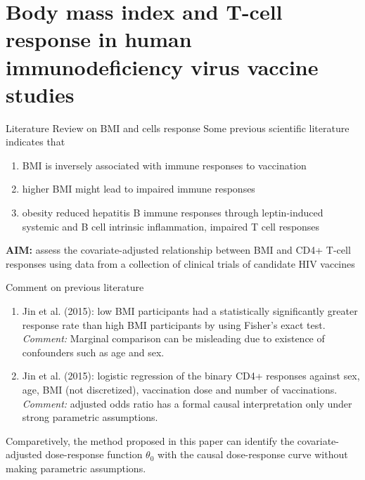 \documentclass{beamer}
\begin{document}
\section{Body mass index and T-cell response in human immunodeficiency virus vaccine studies}

\begin{frame}{Literature Review on BMI and cells response}
Some previous scientific literature indicates that
\begin{enumerate}
	\item BMI is inversely associated with immune responses to vaccination

	\item higher BMI might lead to impaired	immune responses

	\item obesity reduced hepatitis B immune responses through leptin-induced systemic and B cell intrinsic inflammation, impaired T cell responses
\end{enumerate}
\textbf{AIM:} assess the covariate-adjusted relationship between BMI and CD4+ T-cell responses using data from a collection of clinical trials of candidate HIV vaccines
\end{frame}

\begin{frame}{Comment on previous literature}
\begin{enumerate}
	\item Jin et al. (2015): low BMI participants had a statistically significantly greater response rate than high
	BMI participants by using Fisher's exact test.\\
	\textit{Comment:} Marginal comparison can be misleading due to existence of confounders such as age and sex.

	\item Jin
	et al. (2015): logistic regression of the binary CD4+ responses against sex, age,
	BMI (not discretized), vaccination dose and number of vaccinations.\\
	\textit{Comment:} adjusted odds ratio has a formal causal interpretation only under strong parametric
	assumptions.
\end{enumerate}
Comparetively, the method proposed in this paper can identify the covariate-adjusted dose-response function
$\theta_0$ with the causal dose-response curve without making parametric assumptions.
\end{frame}
\end{document}
